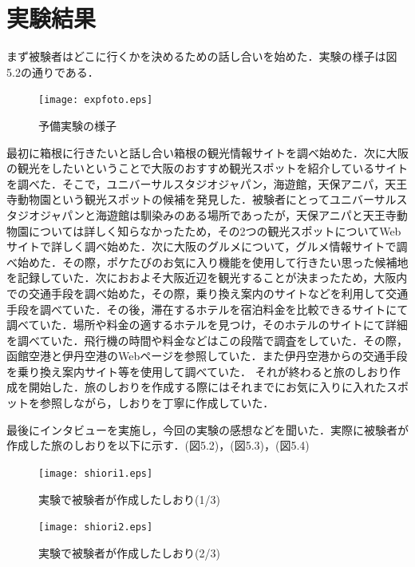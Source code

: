 \documentclass{funthesis}
\begin{document}
\section{実験結果}
まず被験者はどこに行くかを決めるための話し合いを始めた．実験の様子は図5.2の通りである．

\begin{figure}[htpb]
\begin{center}
\texttt{[image: expfoto.eps]}
\caption{予備実験の様子}
\end{center}
\end{figure}


最初に箱根に行きたいと話し合い箱根の観光情報サイトを調べ始めた．次に大阪の観光をしたいということで大阪のおすすめ観光スポットを紹介しているサイトを調べた．そこで，ユニバーサルスタジオジャパン，海遊館，天保アニパ，天王寺動物園という観光スポットの候補を発見した．被験者にとってユニバーサルスタジオジャパンと海遊館は馴染みのある場所であったが，天保アニパと天王寺動物園については詳しく知らなかったため，その2つの観光スポットについてWebサイトで詳しく調べ始めた．次に大阪のグルメについて，グルメ情報サイトで調べ始めた．その際，ポケたびのお気に入り機能を使用して行きたい思った候補地を記録していた．次におおよそ大阪近辺を観光することが決まったため，大阪内での交通手段を調べ始めた，その際，乗り換え案内のサイトなどを利用して交通手段を調べていた．その後，滞在するホテルを宿泊料金を比較できるサイトにて調べていた．場所や料金の適するホテルを見つけ，そのホテルのサイトにて詳細を調べていた．飛行機の時間や料金などはこの段階で調査をしていた．その際，函館空港と伊丹空港のWebページを参照していた．また伊丹空港からの交通手段を乗り換え案内サイト等を使用して調べていた．
それが終わると旅のしおり作成を開始した．旅のしおりを作成する際にはそれまでにお気に入りに入れたスポットを参照しながら，しおりを丁寧に作成していた．


最後にインタビューを実施し，今回の実験の感想などを聞いた．実際に被験者が作成した旅のしおりを以下に示す．(図5.2)，(図5.3)，(図5.4)\\

\begin{figure}[htpb]
\begin{center}
\texttt{[image: shiori1.eps]}
\caption{実験で被験者が作成したしおり(1/3)}
\end{center}
\end{figure}

\begin{figure}[htpb]
\begin{center}
\texttt{[image: shiori2.eps]}
\caption{実験で被験者が作成したしおり(2/3)}
\end{center}
\end{figure}
\end{document}
